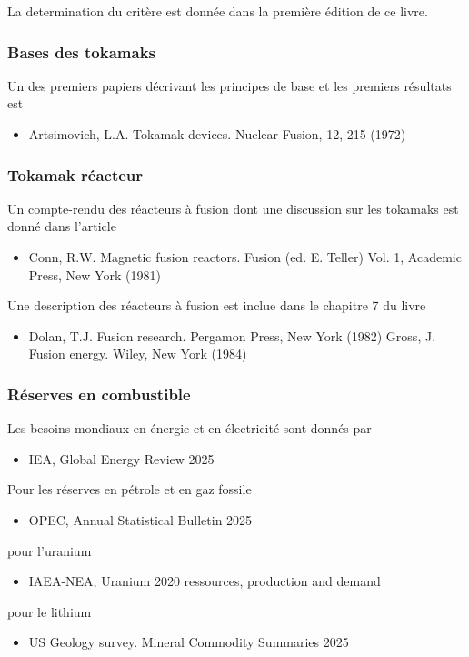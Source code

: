 \documentclass[main.tex]{subfiles}
\begin{document}
La determination du critère est donnée dans la première édition de ce livre.

\subsubsection*{Bases des tokamaks}

Un des premiers papiers décrivant les principes de base et les premiers résultats est
\begin{itemize}
	\item Artsimovich, L.A. Tokamak devices. Nuclear Fusion, 12, 215 (1972)
\end{itemize}

\subsubsection*{Tokamak réacteur}

Un compte-rendu des réacteurs à fusion dont une discussion sur les tokamaks est donné dans l'article

\begin{itemize}
	\item Conn, R.W. Magnetic fusion reactors. Fusion (ed. E. Teller) Vol. 1, Academic Press, New York (1981)
\end{itemize}

Une description des réacteurs à fusion est inclue dans le chapitre 7 du livre
\begin{itemize}
	\item Dolan, T.J. Fusion research. Pergamon Press, New York (1982)
	Gross, J. Fusion energy. Wiley, New York (1984)
\end{itemize}

\subsubsection*{Réserves en combustible}

Les besoins mondiaux en énergie et en électricité sont donnés par
\begin{itemize}
	\item IEA, Global Energy Review 2025
\end{itemize}
Pour les réserves en pétrole et en gaz fossile
\begin{itemize}
	\item OPEC, Annual Statistical Bulletin 2025 
\end{itemize}
pour l'uranium
\begin{itemize}
	\item IAEA-NEA, Uranium 2020 ressources, production and demand
\end{itemize}
pour le lithium
\begin{itemize}
	\item US Geology survey.  Mineral Commodity Summaries 2025
\end{itemize}
\end{document}
